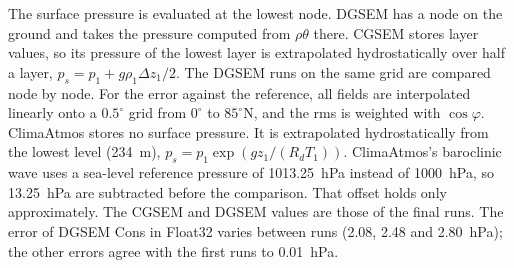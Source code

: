 \documentclass[11pt,a4paper]{article}
\begin{document}
The surface pressure is evaluated at the lowest node. DGSEM has a node on
the ground and takes the pressure computed from $\rho\theta$ there. CGSEM
stores layer values, so its pressure of the lowest layer is extrapolated
hydrostatically over half a layer, $p_s=p_1+g\rho_1\Delta z_1/2$.
The DGSEM runs on the same grid are compared node by node.
For the error against the reference, all fields are interpolated
linearly onto a $0.5^\circ$ grid from $0^\circ$ to $85^\circ$N, and the rms is
weighted with $\cos\varphi$. ClimaAtmos stores no surface pressure. It is
extrapolated hydrostatically from the lowest level (234~m),
$p_s=p_1\exp(g z_1/(R_d T_1))$. ClimaAtmos's baroclinic wave uses a
sea-level reference pressure of 1013.25~hPa instead of 1000~hPa, so
13.25~hPa are subtracted before the comparison. That offset holds
only approximately. The CGSEM and DGSEM values are those of the final
runs. The error of DGSEM Cons in Float32 varies between runs (2.08, 2.48
and 2.80~hPa); the other errors agree with the first runs to 0.01~hPa.
\end{document}
